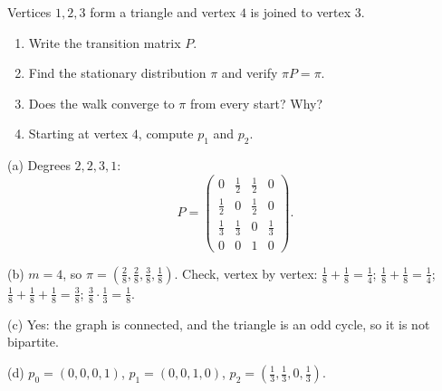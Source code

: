 \begin{question}
    Vertices $1, 2, 3$ form a triangle and vertex $4$ is joined to vertex $3$.
    \begin{enumerate}[label=(\alph*)]
        \item Write the transition matrix $P$.
        \item Find the stationary distribution $\pi$ and verify $\pi P = \pi$.
        \item Does the walk converge to $\pi$ from every start? Why?
        \item Starting at vertex $4$, compute $p_1$ and $p_2$.
    \end{enumerate}
\end{question}
\begin{msolution}
    (a) Degrees $2, 2, 3, 1$:
    \[P = \begin{pmatrix}
            0            & \tfrac{1}{2} & \tfrac{1}{2} & 0            \\
            \tfrac{1}{2} & 0            & \tfrac{1}{2} & 0            \\
            \tfrac{1}{3} & \tfrac{1}{3} & 0            & \tfrac{1}{3} \\
            0            & 0            & 1            & 0
        \end{pmatrix}.\]

    (b) $m = 4$, so $\pi = \left(\frac{2}{8}, \frac{2}{8}, \frac{3}{8}, \frac{1}{8}\right)$. Check,
    vertex by vertex: $\frac{1}{8} + \frac{1}{8} = \frac{1}{4}$;
    $\frac{1}{8} + \frac{1}{8} = \frac{1}{4}$; $\frac{1}{8} + \frac{1}{8} + \frac{1}{8} = \frac{3}{8}$;
    $\frac{3}{8} \cdot \frac{1}{3} = \frac{1}{8}$.

    (c) Yes: the graph is connected, and the triangle is an odd cycle, so it is not bipartite.

    (d) $p_0 = (0,0,0,1)$, $p_1 = (0, 0, 1, 0)$, $p_2 = \left(\frac{1}{3}, \frac{1}{3}, 0, \frac{1}{3}\right)$.
\end{msolution}


